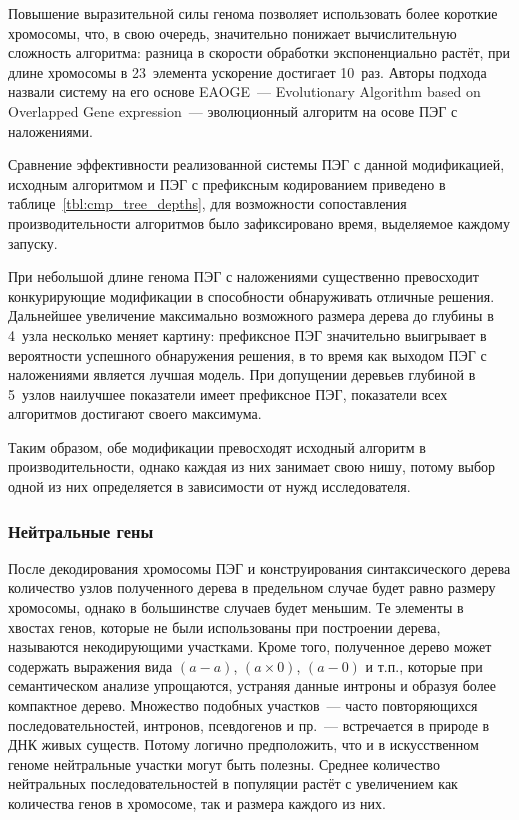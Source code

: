 Повышение выразительной силы генома позволяет использовать более короткие хромосомы, что, в свою очередь, значительно понижает вычислительную сложность алгоритма: разница в скорости обработки экспоненциально растёт, при длине хромосомы в 23~элемента ускорение достигает 10~раз. Авторы подхода назвали систему на его основе EAOGE~--- Evolutionary Algorithm based on Overlapped Gene expression~--- эволюционный алгоритм на осове ПЭГ с наложениями. 

Сравнение эффективности реализованной системы ПЭГ с данной модификацией, исходным алгоритмом и ПЭГ с префиксным кодированием приведено в таблице~\ref{tbl:cmp_tree_depths}, для возможности сопоставления производительности алгоритмов было зафиксировано время, выделяемое каждому запуску.

При небольшой длине генома ПЭГ с наложениями существенно превосходит конкурирующие модификации в способности обнаруживать отличные решения. Дальнейшее увеличение максимально возможного размера дерева до глубины в 4~узла несколько меняет картину: префиксное ПЭГ значительно выигрывает в вероятности успешного обнаружения решения, в то время как выходом ПЭГ с наложениями является лучшая модель. При допущении деревьев глубиной в 5~узлов наилучшее показатели имеет префиксное ПЭГ, показатели всех алгоритмов достигают своего максимума.

Таким образом, обе модификации превосходят исходный алгоритм в производительности, однако каждая из них занимает свою нишу, потому выбор одной из них определяется в зависимости от нужд исследователя.




\subsubsection{Нейтральные гены}

После декодирования хромосомы ПЭГ и конструирования синтаксического дерева количество узлов полученного дерева в предельном случае будет равно размеру хромосомы, однако в большинстве случаев будет меньшим. Те элементы в хвостах генов, которые не были использованы при построении дерева, называются некодирующими участками. Кроме того, полученное дерево может содержать выражения вида $(a - a)$, $(a \times 0)$, $(a - 0)$ и т.п., которые при семантическом анализе упрощаются, устраняя данные интроны и образуя более компактное дерево. Множество подобных участков~--- часто повторяющихся последовательностей, интронов, псевдогенов и пр.~--- встречается в природе в ДНК живых существ. Потому логично предположить, что и в искусственном геноме нейтральные участки могут быть полезны. Среднее количество нейтральных последовательностей в популяции растёт с увеличением как количества генов в хромосоме, так и размера каждого из них.

